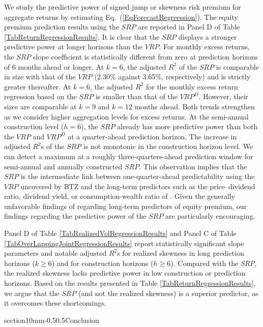 \documentclass[11pt]{article}
\makeatletter
\renewcommand\section{\@startsection%
    {section}{1}{0mm}{-0.5\baselineskip}{0.5\baselineskip}{\bfseries\Large}}
\makeatother
\begin{document}
We study the predictive power of signed jump or skewness risk premium for aggregate returns by estimating Eq.~(\ref{EqForecastRegreession}). The equity premium prediction results using the $SRP$ are reported in Panel D of Table \ref{TabReturnRegressionResults}. It is clear that the $SRP$ displays a stronger predictive power at longer horizons than the $VRP$. For monthly excess returns, the $SRP$ slope coefficient is statistically different from zero at prediction horizons of 6 months ahead or longer. At $k=6$, the adjusted $R^2$ of the $SRP$ is comparable in size with that of the $VRP$ (2.30\% against 3.65\%, respectively) and is strictly greater thereafter. At $k=6$, the adjusted $R^2$ for the monthly excess return regression based on the $SRP$ is smaller than that of the $VRP^D$. However, their sizes are comparable at $k=9$ and $k=12$ months ahead. Both trends strengthen as we consider higher aggregation levels for excess returns. At the semi-annual construction level ($h=6$), the $SRP$ already has more predictive power than both the $VRP$ and $VRP^D$ at a quarter-ahead prediction horizon. The increase in adjusted $R^2$s of the $SRP$ is not monotonic in the construction horizon level. We can detect a maximum at a roughly three-quarters-ahead prediction window for semi-annual and annually constructed $SRP$. This observation implies that the $SRP$ is the intermediate link between one-quarter-ahead predictability using the $VRP$ uncovered by BTZ and the long-term predictors such as the price--dividend ratio, dividend yield, or consumption-wealth ratio of \cite{LettauLudvigson01CAY}. Given the generally unfavorable findings of \cite{GoyalWelch08RFS} regarding long-term predictors of equity premium, our findings regarding the predictive power of the $SRP$ are particularly encouraging.

Panel D of Table \ref{TabRealizedVolRegressionResults} and Panel C of Table \ref{TabOverLappingJointRegressionResults} report statistically significant slope parameters and notable adjusted $R^2$s for realized skewness in long prediction horizons ($k\geq 6$) and for construction horizons ($h\geq 6$). Compared with the \textit{SRP}, the realized skewness lacks predictive power in low construction or prediction horizons. Based on the results presented in Table \ref{TabReturnRegressionResults}, we argue that the $SRP$ (and not the realized skewness) is a superior predictor, as it overcomes these shortcomings.

\section{Conclusion}\label{SecConclusion}
\end{document}
